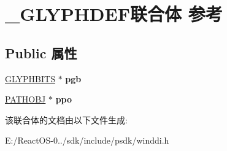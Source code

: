 \hypertarget{union___g_l_y_p_h_d_e_f}{}\section{\+\_\+\+G\+L\+Y\+P\+H\+D\+E\+F联合体 参考}
\label{union___g_l_y_p_h_d_e_f}
\subsection*{Public 属性}
\begin{DoxyCompactItemize}
\item 
\mbox{\label{union___g_l_y_p_h_d_e_f_a348cb1f7d893220a558c998d41e60743}} 
\hyperlink{struct___g_l_y_p_h_b_i_t_s}{G\+L\+Y\+P\+H\+B\+I\+TS} $\ast$ {\bfseries pgb}
\item 
\mbox{\label{union___g_l_y_p_h_d_e_f_acc02ded5710d0d22f0b2650aea73fe84}} 
\hyperlink{struct___p_a_t_h_o_b_j}{P\+A\+T\+H\+O\+BJ} $\ast$ {\bfseries ppo}
\end{DoxyCompactItemize}


该联合体的文档由以下文件生成\+:\begin{DoxyCompactItemize}
\item 
E\+:/\+React\+O\+S-\/0../sdk/include/psdk/winddi.\+h\end{DoxyCompactItemize}
